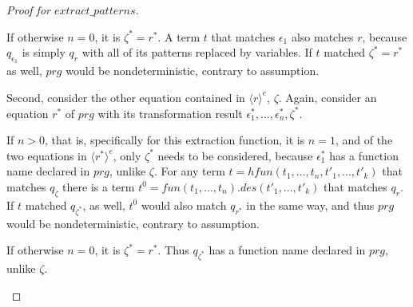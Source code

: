 \documentclass[11pt]{article} %
\begin{document}
\begin{proof}[Proof for $extract\_patterns$]
\begin{itemize}
If otherwise $n = 0$, it is $\zeta^* = r^*$. A term $t$ that matches $\epsilon_1$ also matches $r$, because $q_{\epsilon_1}$ is simply $q_r$ with all of its patterns replaced by variables. If $t$ matched $\zeta^* = r^*$ as well, $prg$ would be nondeterministic, contrary to assumption.

Second, consider the other equation contained in $\langle r \rangle^e$, $\zeta$. Again, consider an equation $r^*$ of $prg$ with its transformation result $\epsilon^*_1, ..., \epsilon^*_n, \zeta^*$.

If $n > 0$, that is, specifically for this extraction function, it is $n = 1$, and of the two equations in $\langle r^* \rangle^e$, only $\zeta^*$ needs to be considered, because $\epsilon^*_1$ has a function name declared in $prg$, unlike $\zeta$. For any term $t = hfun(t_1, ..., t_n, t'_1, ..., t'_k)$ that matches $q_\zeta$ there is a term $t^0 = fun(t_1, ..., t_n).des(t'_1, ..., t'_k)$ that matches $q_r$. If $t$ matched $q_{\zeta^*}$, as well, $t^0$ would also match $q_{r^*}$ in the same way, and thus $prg$ would be nondeterministic, contrary to assumption.

If otherwise $n = 0$, it is $\zeta^* = r^*$. Thus $q_{\zeta^*}$ has a function name declared in $prg$, unlike $\zeta$.

\end{itemize}

\end{proof}
\end{document}
